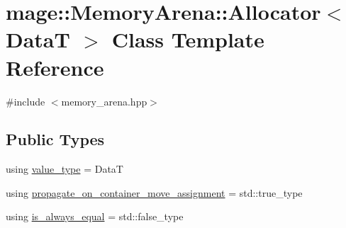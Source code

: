 \hypertarget{classmage_1_1_memory_arena_1_1_allocator}{}\section{mage\+:\+:Memory\+Arena\+:\+:Allocator$<$ DataT $>$ Class Template Reference}
\label{classmage_1_1_memory_arena_1_1_allocator}


{\ttfamily \#include $<$memory\+\_\+arena.\+hpp$>$}

\subsection*{Public Types}
\begin{DoxyCompactItemize}
\item 
using \hyperlink{classmage_1_1_memory_arena_1_1_allocator_a6ae3ef840bd738889b2c4136294a4f6d}{value\+\_\+type} = DataT
\item 
using \hyperlink{classmage_1_1_memory_arena_1_1_allocator_adeee02145ab4a2eca5e38a70babd81e0}{propagate\+\_\+on\+\_\+container\+\_\+move\+\_\+assignment} = std\+::true\+\_\+type
\item 
using \hyperlink{classmage_1_1_memory_arena_1_1_allocator_aa03d66542fcf507199911bca8b270bfc}{is\+\_\+always\+\_\+equal} = std\+::false\+\_\+type
\end{DoxyCompactItemize}
